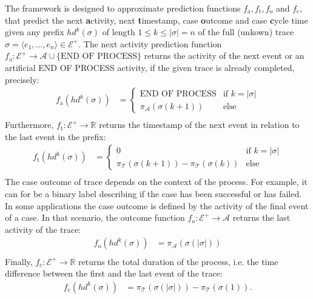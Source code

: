 The framework is designed to approximate prediction functions $f_\mathrm{a}, f_\mathrm{t}, f_\mathrm{o}$ and $f_\mathrm{c}$, that predict the next \textbf{a}ctivity, next \textbf{t}imestamp, case \textbf{o}utcome and case \textbf{c}ycle time given any prefix $hd^k(\sigma)$ of length $1 \leq k \leq |\sigma| = n$ of the full (unkown) trace $\sigma = \langle e_1, \dots, e_{n} \rangle \in \mathcal{E}^+$.
The next activity prediction function $f_\mathrm{a}\colon \mathcal{E}^+ \to \mathcal{A} \cup \{\text{END OF PROCESS}\}$ returns the activity of the next event or an artificial END OF PROCESS activity, if the given trace is already completed, precisely:
\begin{align*}
f_\mathrm{a}(hd^k(\sigma)) &= 
\begin{cases}
	\text{END OF PROCESS}& \text{if $k = |\sigma|$} \\
	\pi_\mathcal{A}(\sigma(k+1)) & \text{else} 
\end{cases}\\
\end{align*}
Furthermore, $f_\mathrm{t} \colon \mathcal{E}^+ \to \mathbb{R}$ returns the timestamp of the next event in relation to the last event in the prefix:
\begin{align*}
f_\mathrm{t}(hd^k(\sigma)) &=
\begin{cases}
0 & \text{if $k = |\sigma|$} \\
\pi_\mathcal{T}(\sigma(k+1)) - \pi_\mathcal{T}(\sigma(k)) & \text{else} 
\end{cases}\\
\end{align*}
The case outcome of trace depends on the context of the process.
For example, it can for be a binary label describing if the case has been successful or has failed.
In some applications the case outcome is defined by the activity of the final event of a case.
In that scenario, the outcome function $f_\mathrm{o} \colon \mathcal{E}^+ \to \mathcal{A}$ returns the last activity of the trace:
\begin{align*}
f_\mathrm{o}(hd^k(\sigma)) &= \pi_\mathcal{A}(\sigma(|\sigma|))\\
\end{align*}
Finally, $f_\mathrm{c} \colon \mathcal{E}^+ \to \mathbb{R}$ returns the total duration of the process, i.e. the time difference between the first and the last event of the trace:
\begin{align*}
f_\mathrm{c}(hd^k(\sigma)) &=  \pi_\mathcal{T}(\sigma(|\sigma|))-  \pi_\mathcal{T}(\sigma(1)).
\end{align*}

